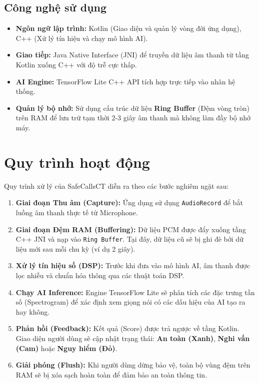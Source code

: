 \documentclass[12pt,a4paper]{article}
\begin{document}
\subsection{Công nghệ sử dụng}
\begin{itemize}
    \item \textbf{Ngôn ngữ lập trình:} Kotlin (Giao diện và quản lý vòng đời ứng dụng), C++ (Xử lý tín hiệu và chạy mô hình AI).
    \item \textbf{Giao tiếp:} Java Native Interface (JNI) để truyền dữ liệu âm thanh từ tầng Kotlin xuống C++ với độ trễ cực thấp.
    \item \textbf{AI Engine:} TensorFlow Lite C++ API tích hợp trực tiếp vào nhân hệ thống.
    \item \textbf{Quản lý bộ nhớ:} Sử dụng cấu trúc dữ liệu \textbf{Ring Buffer} (Đệm vòng tròn) trên RAM để lưu trữ tạm thời 2-3 giây âm thanh mà không làm đầy bộ nhớ máy.
\end{itemize}

\section{Quy trình hoạt động}
Quy trình xử lý của SafeCallsCT diễn ra theo các bước nghiêm ngặt sau:

\begin{enumerate}
    \item \textbf{Giai đoạn Thu âm (Capture):} Ứng dụng sử dụng \texttt{AudioRecord} để bắt luồng âm thanh thực tế từ Microphone.
    \item \textbf{Giai đoạn Đệm RAM (Buffering):} Dữ liệu PCM được đẩy xuống tầng C++ JNI và nạp vào \texttt{Ring Buffer}. Tại đây, dữ liệu cũ sẽ bị ghi đè bởi dữ liệu mới sau mỗi chu kỳ (ví dụ 2 giây).
    \item \textbf{Xử lý tín hiệu số (DSP):} Trước khi đưa vào mô hình AI, âm thanh được lọc nhiễu và chuẩn hóa thông qua các thuật toán DSP.
    \item \textbf{Chạy AI Inference:} Engine TensorFlow Lite sẽ phân tích các đặc trưng tần số (Spectrogram) để xác định xem giọng nói có các dấu hiệu của AI tạo ra hay không.
    \item \textbf{Phản hồi (Feedback):} Kết quả (Score) được trả ngược về tầng Kotlin. Giao diện người dùng sẽ cập nhật trạng thái: \textbf{An toàn (Xanh)}, \textbf{Nghi vấn (Cam)} hoặc \textbf{Nguy hiểm (Đỏ)}.
    \item \textbf{Giải phóng (Flush):} Khi người dùng dừng bảo vệ, toàn bộ vùng đệm trên RAM sẽ bị xóa sạch hoàn toàn để đảm bảo an toàn thông tin.
\end{enumerate}
\end{document}
